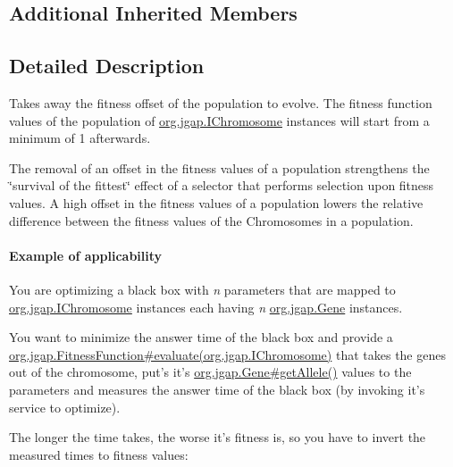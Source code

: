 \subsection*{Additional Inherited Members}


\subsection{Detailed Description}
Takes away the fitness offset of the population to evolve. The fitness function values of the population of \hyperlink{interfaceorg_1_1jgap_1_1_i_chromosome}{org.\-jgap.\-I\-Chromosome} instances will start from a minimum of 1 afterwards. 

The removal of an offset in the fitness values of a population strengthens the \char`\"{}survival of the fittest\char`\"{} effect of a selector that performs selection upon fitness values. A high offset in the fitness values of a population lowers the relative difference between the fitness values of the Chromosomes in a population. 

\paragraph*{Example of applicability}

You are optimizing a black box with {\itshape n} parameters that are mapped to \hyperlink{interfaceorg_1_1jgap_1_1_i_chromosome}{org.\-jgap.\-I\-Chromosome} instances each having {\itshape n} \hyperlink{interfaceorg_1_1jgap_1_1_gene}{org.\-jgap.\-Gene} instances.\par
 You want to minimize the answer time of the black box and provide a \hyperlink{classorg_1_1jgap_1_1_fitness_function_a0078e42480eac93729f906ac4dc185d9}{org.\-jgap.\-Fitness\-Function\#evaluate(org.\-jgap.\-I\-Chromosome)} that takes the genes out of the chromosome, put's it's \hyperlink{interfaceorg_1_1jgap_1_1_gene_aa06c80639659ddbcfa1cfe7b7bb109f9}{org.\-jgap.\-Gene\#get\-Allele()} values to the parameters and measures the answer time of the black box (by invoking it's service to optimize). \par
 The longer the time takes, the worse it's fitness is, so you have to invert the measured times to fitness values\-: \label{_bboptimizer}%
 
